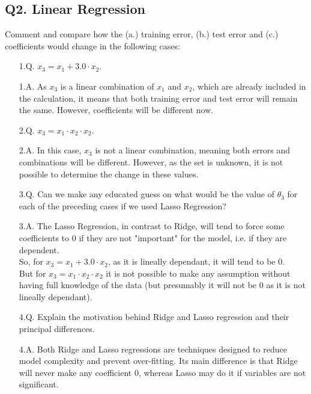 \documentclass[11pt]{scrartcl}
\begin{document}
    \subsection{Q2. Linear Regression}
    Comment and compare how the (a.) training error, (b.) test error and (c.) coefficients would change in the following cases:
    \begin{itemize}
        \item[1.Q.] $x_3 = x_1 + 3.0 \cdot x_2$.
        \item[1.A.] As $x_3$ is a linear combination of $x_1$ and $x_2$, which are already included in the calculation, it means that both training error and test error will remain the same. However, coefficients will be different now.\\
        \item[2.Q.] $x_3 = x_1 \cdot x_2 \cdot x_2$.
        \item[2.A.] In this case, $x_3$ is not a linear combination, meaning both errors and combinations will be different. However, as the set is unknown, it is not possible to determine the change in these values.\\
        \item[3.Q.] Can we make any educated guess on what would be the value of $\theta_3$ for each of the preceding cases if we used Lasso Regression?
        \item[3.A.] The Lasso Regression, in contrast to Ridge, will tend to force some coefficients to 0 if they are not "important" for the model, i.e. if they are dependent.\\
        So, for $x_3 = x_1 + 3.0 \cdot x_2$, as it is lineally dependant, it will tend to be 0.\\
        But for $x_3 = x_1 \cdot x_2 \cdot x_2$ it is not possible to make any assumption without having full knowledge of the data (but presumably it will not be $0$ as it is not lineally dependant).\\
        \item[4.Q.] Explain the motivation behind Ridge and Lasso regression and their principal differences.
        \item[4.A.] Both Ridge and Lasso regressions are techniques designed to reduce model complexity and prevent over-fitting. Its main difference is that Ridge will never make any coefficient $0$, whereas Lasso may do it if variables are not significant.\\
    \end{itemize}
\end{document}
